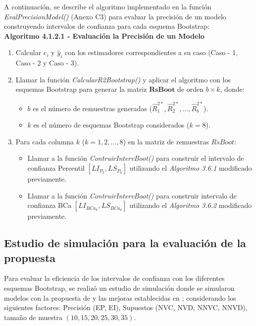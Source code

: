 A continuación, se describe el algoritmo implementado en la función \textit{EvalPrecisionModel()} (Anexo C3) para evaluar la precisión de un modelo construyendo intervalos de confianza para cada esquema Bootstrap:\\


\textbf{Algoritmo 4.1.2.1 - Evaluación la Precisión de un Modelo}

\begin{enumerate}
	
	\item Calcular $e_i$ y $\hat{y}_{i}$ con los estimadores correspondientes a su caso (Caso - 1, Caso - 2 y Caso - 3).
	
	\item Llamar la función \textit{CalcularR2Bootstrap()} y aplicar el algoritmo con los esquemas Bootstrap para generar la matriz \( \mathbf{RsBoot} \) de orden \( b \times k \), donde:
	\begin{itemize}
		\item \( b \) es el número de remuestras generadas (\( \hat{R}^{2*}_{1}, \hat{R}^{2*}_{2}, \dots, \hat{R}^{2*}_{b} \)).
		\item \( k \) es el número de esquemas Bootstrap considerados (\( k = 8 \)).
	\end{itemize}
	
	\item Para cada columna \( k \) (\( k = 1, 2, \dots, 8 \)) en la matriz de remuestras \( RsBoot \):
	\begin{itemize}
		\item  Llamar a la función \textit{ContruirIntervBoot()} para construir el intervalo de confianza Percentil \( [LI_{P_k}, LS_{P_k}] \) utilizando el \textit{Algoritmo 3.6.1} modificado previamente.
		\item Llamar a la función \textit{ContruirIntervBoot()} para construir intervalo de confianza BCa \( [LI_{BCa_k}, LS_{BCa_k}] \) utilizando el \textit{Algoritmo 3.6.2} modificado previamente.
	\end{itemize}
\end{enumerate}





	 
\subsection{Estudio de simulación para la evaluación de la propuesta}

Para evaluar la eficiencia de los intervalos de confianza con los diferentes esquemas Bootstrap, se realizó un estudio de simulación donde se simularon modelos con la propuesta de \textcite{febles-2014} y las mejoras establecidas en \textcite{zacarias-2023}; considerando los siguientes factores: Precisión (EP, EI), Supuestos (NVC, NVD, NNVC, NNVD), tamaño de muestra $(10, 15, 20, 25, 30, 35)$.\\


